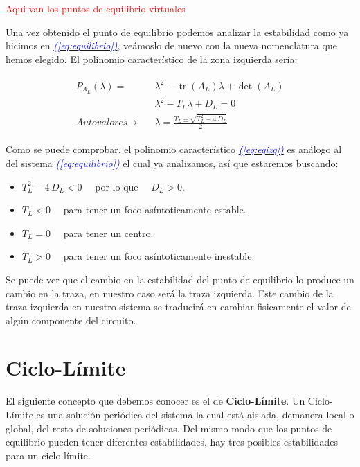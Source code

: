 \documentclass[12pt,a4paper]{report} %
\newcommand{\eref}[1]{\hyperref[#1]{\textcolor{blue}{\textit{(\ref*{#1})}}}}
\newcommand{\tr}{\operatorname{\textrm{tr}}}
\begin{document}
		\textcolor{red}{Aqui van los puntos de equilibrio virtuales}
		
		\newpage
		
		\vspace{0.5cm} Una vez obtenido el punto de equilibrio podemos analizar la estabilidad como ya hicimos en \eref{eq:equilibrio}, veámoslo de nuevo con la nueva nomenclatura que hemos elegido. El polinomio característico de la zona izquierda sería:
		
		\begin{eqnarray}
			\label{eq:eqizq}
			\begin{aligned}
				P_{A_L}(\lambda)=&\lambda^2-\tr(A_L)\lambda+\det(A_L) \\[1mm]
				&\lambda^2-T_L\lambda+D_L=0 \\[2mm]
				\textit{Autovalores}\rightarrow \quad &\lambda=\frac{T_L\pm \sqrt{T_L^2-4\,D_L}}{2}
			\end{aligned}
		\end{eqnarray}\smallskip

		\vspace{0.5cm}Como se puede comprobar, el polinomio característico \eref{eq:eqizq} es análogo al del sistema \eref{eq:equilibrio} el cual ya analizamos, así que estaremos buscando:
		
		\begin{itemize}
			\item $T_L^2-4\,D_L<0\quad$ por lo que $\quad D_L>0$.
			\item $T_L<0\quad$ para tener un foco asíntoticamente estable.
			\item $T_L=0\quad$ para tener un centro.
			\item $T_L>0\quad$ para tener un foco asíntoticamente inestable.
		\end{itemize}\smallskip
		
		\vspace{0.5cm}Se puede ver que el cambio en la estabilidad del punto de equilibrio lo produce un cambio en la traza, en nuestro caso será la traza izquierda. Este cambio de la traza izquierda en nuestro sistema se traducirá en cambiar fisicamente el valor de algún componente del circuito.
		
		\newpage
		
		\section{Ciclo-Límite}
		
		\vspace{0.5cm}El siguiente concepto que debemos conocer es el de \textbf{Ciclo-Límite}. Un Ciclo-Límite es una solución periódica del sistema la cual está aislada, demanera local o global, del resto de soluciones periódicas. Del mismo modo que los puntos de equilibrio pueden tener diferentes estabilidades, hay tres posibles estabilidades para un ciclo límite.\\[0.5cm]
		
\end{document}
